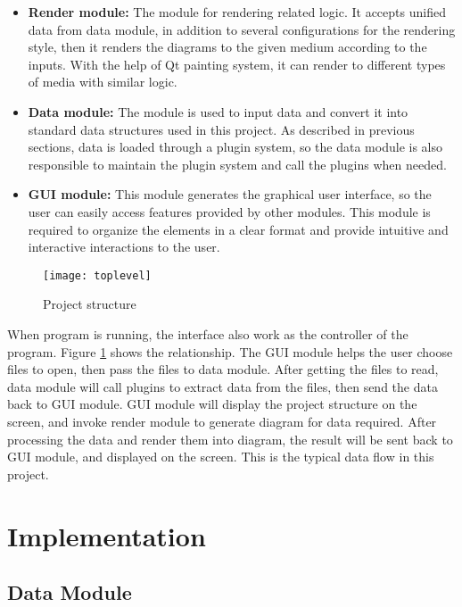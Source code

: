\begin{itemize}
	\item \textbf{Render module:} The module for rendering related logic. It accepts unified data from data module, in addition to several configurations for the rendering style, then it renders the diagrams to the given medium according to the inputs. With the help of Qt painting system, it can render to different types of media with similar logic.
	\item \textbf{Data module:} The module is used to input data and convert it into standard data structures used in this project. As described in previous sections, data is loaded through a plugin system, so the data module is also responsible to maintain the plugin system and call the plugins when needed.
	\item \textbf{GUI module:} This module generates the graphical user interface, so the user can easily access features provided by other modules. This module is required to organize the elements in a clear format and provide intuitive and interactive interactions to the user.
\end{itemize}

\begin{figure}[!htb]
	\centering
	\texttt{[image: toplevel]}
	\caption{Project structure}
	\label{fig:toplevel}
\end{figure}

When program is running, the interface also work as the controller of the program. Figure \ref{fig:toplevel} shows the relationship. The GUI module helps the user choose files to open, then pass the files to data module. After getting the files to read, data module will call plugins to extract data from the files, then send the data back to GUI module. GUI module will display the project structure on the screen, and invoke render module to generate diagram for data required. After processing the data and render them into diagram, the result will be sent back to GUI module, and displayed on the screen. This is the typical data flow in this project.

\section{Implementation}

\subsection{Data Module}

